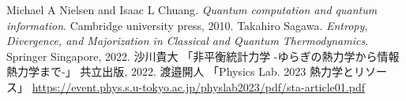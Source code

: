 \documentclass[report]{jlreq}
\begin{document}
\begin{thebibliography}{99}
Michael A Nielsen and Isaac L Chuang. 
    \textit{Quantum computation and quantum information}.
    Cambridge university press, 2010.
Takahiro Sagawa. 
    \textit{Entropy, Divergence, and Majorization in Classical and Quantum Thermodynamics}. 
    Springer Singapore, 2022.
沙川貴大
    「非平衡統計力学 -ゆらぎの熱力学から情報熱力学まで-」
    共立出版, 2022. 
渡邉開人
    「Physics Lab. 2023 熱力学とリソース」
    \url{https://event.phys.s.u-tokyo.ac.jp/physlab2023/pdf/sta-article01.pdf}
\end{thebibliography}
  
\end{document}
